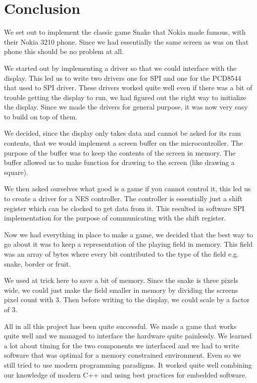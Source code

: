 \chapter*{Conclusion}

We set out to implement the classic game Snake that Nokia made famous,
with their Nokia 3210 phone. 
Since we had essentially the same screen as was on that phone this should be no problem at all.

We started out by implementing a driver so that we could interface with the display. This led us to write two drivers one for SPI and one for the PCD8544 that used to SPI driver. These drivers worked quite well even if there was a bit of trouble getting the display to run, we had figured out the right way to initialize the display. Since we made the drivers for general purpose, it was now very easy to build on top of them.

We decided, since the display only takes data and cannot be asked for its ram contents, that we would implement a screen buffer on the microcontroller. The purpose of the buffer was to keep the contents of the screen in memory. The buffer allowed us to make function for drawing to the screen (like drawing a square).

We then asked ourselves what good is a game if you cannot control it, this led us to create a driver for a NES controller. The controller is essentially just a shift register which can be clocked to get data from it. This resulted in software SPI implementation for the purpose of communicating with the shift register.

Now we had everything in place to make a game, we decided that the best way to go about it was to keep a representation of the playing field in memory. This field was an array of bytes where every bit contributed to the type of the field e.g. snake, border or fruit.

We used at trick here to save a bit of memory. Since the snake is three pixels wide, we could just make the field smaller in memory by dividing the screens pixel count with 3. Then before writing to the display, we could scale by a factor of 3.

All in all this project has been quite successful. We made a game that works quite well and we managed to interface the hardware quite painlessly. We learned a lot about timing for the two components we interfaced and we had to write software that was optimal for a memory constrained environment. Even so we still tried to use modern programming paradigms. It worked quite well combining our knowledge of modern C++ and using best practices for embedded software.
